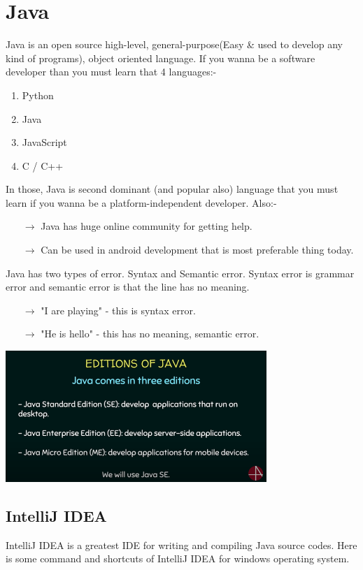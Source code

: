 \documentclass[11 pt]{book}
\begin{document}
\chapter{Java}
Java is an open source high-level, general-purpose(Easy \& used to develop any kind of programs), object oriented language. If you wanna be a software developer than you must learn that 4 languages:-
\begin{enumerate}
	\item Python
	\item Java
	\item JavaScript
	\item C / C++
\end{enumerate}
In those, Java is second dominant (and popular also) language that you must learn if you wanna be a platform-independent developer. Also:-\hfill
\begin{itemize}
	\item[$\rightarrow$] Java has huge online community for getting help.
	\item[$\rightarrow$] Can be used in android development that is most preferable thing today.
\end{itemize}

Java has two types of error. Syntax and Semantic error. Syntax error is grammar error and semantic error is that the line has no meaning.
\begin{itemize}
	\item[$\rightarrow$] "I are playing" - this is syntax error.
	\item[$\rightarrow$] "He is hello" - this has no meaning, semantic error.
\end{itemize}
\begin{center}
	\includegraphics[width=280pt]{Editions of Java.png}
\end{center}

\section{IntelliJ IDEA}
IntelliJ IDEA is a greatest IDE for writing and compiling Java source codes. Here is some command and shortcuts of IntelliJ IDEA for windows operating system.
\end{document}
